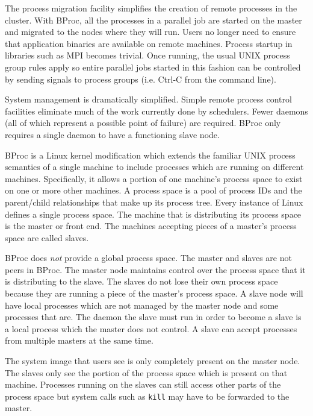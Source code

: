 The process migration facility simplifies the creation of remote
processes in the cluster.  With BProc, all the processes in a parallel
job are started on the master and migrated to the nodes where they
will run.  Users no longer need to ensure that application binaries
are available on remote machines.  Process startup in libraries such
as MPI becomes trivial.  Once running, the usual UNIX process group
rules apply so entire parallel jobs started in this fashion can be
controlled by sending signals to process groups (i.e. Ctrl-C from the
command line).

System management is dramatically simplified.  Simple remote process
control facilities eliminate much of the work currently done by
schedulers.  Fewer daemons (all of which represent a possible point of
failure) are required.  BProc only requires a single daemon to have a
functioning slave node.


BProc is a Linux kernel modification which extends the familiar UNIX
process semantics of a single machine to include processes which are
running on different machines.  Specifically, it allows a
portion of one machine's process space to exist on one or more other
machines.  A process space is a pool of process IDs and the
parent/child relationships that make up its process tree.  Every
instance of Linux defines a single process space.  The machine that is
distributing its process space is the master or front end.  The
machines accepting pieces of a master's process space are called
slaves.

BProc does \emph{not} provide a global process space.  The master and
slaves are not peers in BProc.  The master node maintains control over
the process space that it is distributing to the slave.  The slaves do
not lose their own process space because they are running a piece of
the master's process space.  A slave node will have local processes
which are not managed by the master node and some processes that are.
The daemon the slave must run in order to become a slave is a local
process which the master does not control.  A slave can accept
processes from multiple masters at the same time.

The system image that users see is only completely present on the
master node.  The slaves only see the portion of the process space
which is present on that machine.  Processes running on the slaves can
still access other parts of the process space but system calls such as
\texttt{kill} may have to be forwarded to the master.

